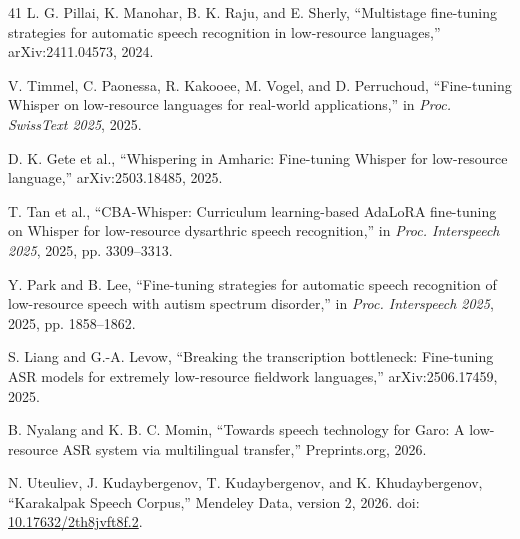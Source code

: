 \documentclass[11pt]{article}
\begin{document}
\begin{thebibliography}{41}
L. G. Pillai, K. Manohar, B. K. Raju, and E. Sherly, ``Multistage fine-tuning strategies for automatic speech recognition in low-resource languages,'' arXiv:2411.04573, 2024.

V. Timmel, C. Paonessa, R. Kakooee, M. Vogel, and D. Perruchoud, ``Fine-tuning Whisper on low-resource languages for real-world applications,'' in \textit{Proc. SwissText 2025}, 2025.

D. K. Gete et al., ``Whispering in Amharic: Fine-tuning Whisper for low-resource language,'' arXiv:2503.18485, 2025.

T. Tan et al., ``CBA-Whisper: Curriculum learning-based AdaLoRA fine-tuning on Whisper for low-resource dysarthric speech recognition,'' in \textit{Proc. Interspeech 2025}, 2025, pp. 3309--3313.

Y. Park and B. Lee, ``Fine-tuning strategies for automatic speech recognition of low-resource speech with autism spectrum disorder,'' in \textit{Proc. Interspeech 2025}, 2025, pp. 1858--1862.

S. Liang and G.-A. Levow, ``Breaking the transcription bottleneck: Fine-tuning ASR models for extremely low-resource fieldwork languages,'' arXiv:2506.17459, 2025.

B. Nyalang and K. B. C. Momin, ``Towards speech technology for Garo: A low-resource ASR system via multilingual transfer,'' Preprints.org, 2026.

N. Uteuliev, J. Kudaybergenov, T. Kudaybergenov, and K. Khudaybergenov, ``Karakalpak Speech Corpus,'' Mendeley Data, version 2, 2026. doi: \href{https://doi.org/10.17632/2th8jvft8f.2}{10.17632/2th8jvft8f.2}.

\end{thebibliography}
\end{document}

